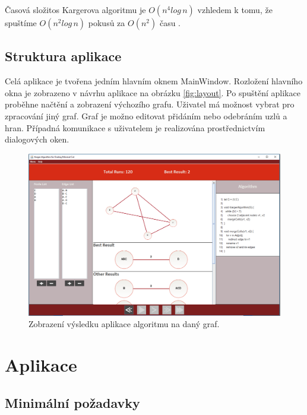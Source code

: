 \documentclass[../projekt.tex]{subfiles}
\begin{document}
Časová složitos Kargerova algoritmu je $O (n^4log \, n)$ vzhledem k tomu, že spuštíme $O (n^2log \, n)$ pokusů za $O(n^2)$ času \cite{karger}. 




\subsection{Struktura aplikace}

Celá aplikace je tvořena jedním hlavním oknem MainWindow. Rozložení hlavního okna je zobrazeno v návrhu aplikace na obrázku \ref{fig:layout}. Po spuštění aplikace proběhne načtění a zobrazení výchozího grafu. Uživatel má možnost vybrat pro zpracování jiný graf. Graf je možno editovat přidáním nebo odebráním uzlů a hran. Případná komunikace s uživatelem je realizována prostřednictvím dialogových oken. 


	\begin{figure}[ht]
    	\begin{center}
  			\includegraphics[scale=0.4]{obrazky-figures/finish.png}
  			\caption{Zobrazení výsledku aplikace algoritmu na daný graf.}
  		\end{center}
	\end{figure}



\newpage
\section{Aplikace}

\subsection{Minimální požadavky}
\end{document}
